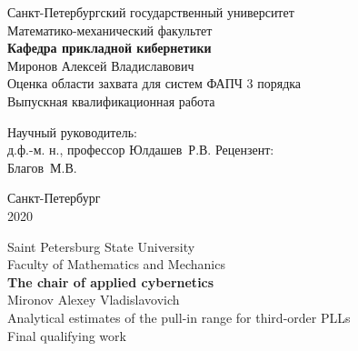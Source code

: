\documentclass[a4paper,14pt]{article} %
\theoremstyle{cited}
\begin{document}

 
\begin{center}
\hfill \break
\normalsize{Санкт-Петербургский государственный университет}\\ 
\hfill \break
\normalsize{Математико-механический факультет}\\
\normalsize{\textbf{Кафедра прикладной кибернетики}}\\
\hfill \break
\hfill \break 
\hfill \break
\hfill \break
\hfill\break
\hfill \break
\normalsize{Миронов Алексей Владиславович}\\
\hfill \break
\large{Оценка области захвата для систем ФАПЧ 3 порядка}\\
\hfill \break
\small{Выпускная квалификационная работа}\\
\hfill \break
\hfill \break
\hfill \break
\hfill \break
\hfill \break
\hfill \break
\end{center}
 
\hfill \break
\hfill \break
\hfill \break
 
 \small{
\begin{flushright}
Научный руководитель:\\
д.ф.-м. н., профессор Юлдашев~Р.\:В.
\break \break
\break \break
Рецензент:\\
Благов~М.\:В.
\end{flushright}
}
\hfill \break
\hfill \break
\hfill \break
\hfill \break
\hfill \break
\hfill \break
\hfill \break
\hfill \break
\hfill \break
\hfill \break
\begin{center} Санкт-Петербург \\
2020 \end{center}
\thispagestyle{empty} %

\begin{center}
\hfill \break
\normalsize{Saint Petersburg State University}\\ 
\hfill \break
\normalsize{Faculty of Mathematics and Mechanics}\\
\normalsize{\textbf{The chair of applied cybernetics}}\\
\hfill \break
\hfill \break 
\hfill \break
\hfill \break
\hfill\break
\hfill \break
\normalsize{Mironov Alexey Vladislavovich}\\
\hfill \break
\large{Analytical estimates of the pull-in range for third-order PLLs}\\
\hfill \break
\small{Final qualifying work}\\
\hfill \break
\hfill \break
\hfill \break
\hfill \break
\hfill \break
\hfill \break
\end{center}
 
\end{document}
